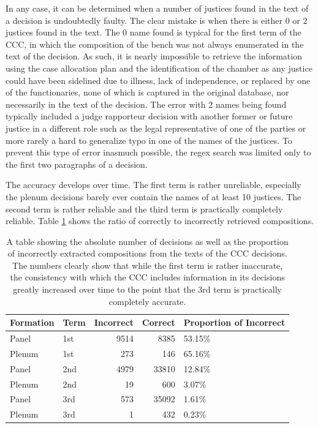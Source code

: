 \documentclass[
  11pt,
]{article}
\begin{document}
In any case, it can be determined when a number of justices found in the text of a decision is undoubtedly faulty. The clear mistake is when there is either 0 or 2 justices found in the text. The 0 name found is typical for the first term of the CCC, in which the composition of the bench was not always enumerated in the text of the decision. As such, it is nearly impossible to retrieve the information using the case allocation plan and the identification of the chamber as any justice could have been sidelined due to illness, lack of independence, or replaced by one of the functionaries, none of which is captured in the original database, nor necessarily in the text of the decision. The error with 2 names being found typically included a judge rapporteur decision with another former or future justice in a different role such as the legal representative of one of the parties or more rarely a hard to generalize typo in one of the names of the justices. To prevent this type of error inasmuch possible, the regex search was limited only to the first two paragraphs of a decision.

The accuracy develops over time. The first term is rather unreliable, especially the plenum decisions barely ever contain the names of at least 10 justices. The second term is rather reliable and the third term is practically completely reliable. Table \ref{tab:check-composition-tab} shows the ratio of correctly to incorrectly retrieved compositions.

\begin{table}
\centering
\caption{\label{tab:check-composition-tab}A table showing the absolute number of decisions as well as the proportion of incorrectly extracted compositions from the texts of the CCC decisions. The numbers clearly show that while the first term is rather inaccurate, the consistency with which the CCC includes information in its decisions greatly increased over time to the point that the 3rd term is practically completely accurate.}
\centering
\begin{tabular}[t]{l|l|r|r|l}
\hline
Formation & Term & Incorrect & Correct & Proportion of Incorrect\\
\hline
Panel & 1st & 9514 & 8385 & 53.15\%\\
\hline
Plenum & 1st & 273 & 146 & 65.16\%\\
\hline
Panel & 2nd & 4979 & 33810 & 12.84\%\\
\hline
Plenum & 2nd & 19 & 600 & 3.07\%\\
\hline
Panel & 3rd & 573 & 35092 & 1.61\%\\
\hline
Plenum & 3rd & 1 & 432 & 0.23\%\\
\hline
\end{tabular}
\end{table}
\end{document}
